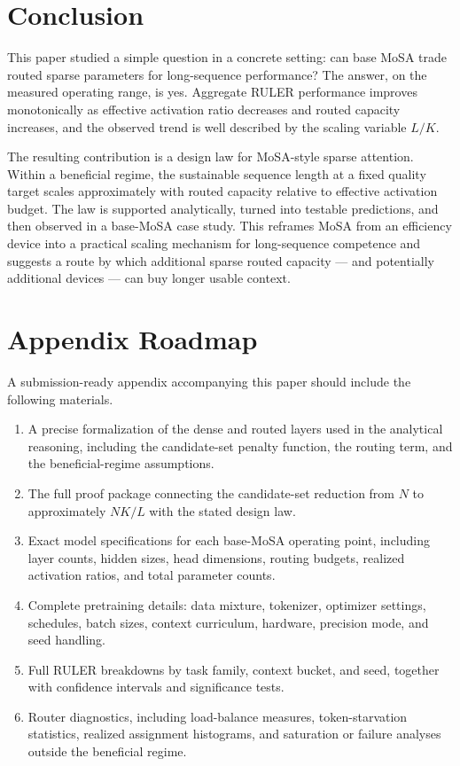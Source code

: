 \documentclass[11pt]{article}
\begin{document}
\section{Conclusion}

This paper studied a simple question in a concrete setting: can base MoSA trade routed sparse parameters for long-sequence performance? The answer, on the measured operating range, is yes. Aggregate RULER performance improves monotonically as effective activation ratio decreases and routed capacity increases, and the observed trend is well described by the scaling variable $L/K$.

The resulting contribution is a design law for MoSA-style sparse attention. Within a beneficial regime, the sustainable sequence length at a fixed quality target scales approximately with routed capacity relative to effective activation budget. The law is supported analytically, turned into testable predictions, and then observed in a base-MoSA case study. This reframes MoSA from an efficiency device into a practical scaling mechanism for long-sequence competence and suggests a route by which additional sparse routed capacity --- and potentially additional devices --- can buy longer usable context.

\appendix

\section{Appendix Roadmap}

A submission-ready appendix accompanying this paper should include the following materials.

\begin{enumerate}[leftmargin=2em]
    \item A precise formalization of the dense and routed layers used in the analytical reasoning, including the candidate-set penalty function, the routing term, and the beneficial-regime assumptions.
    \item The full proof package connecting the candidate-set reduction from $N$ to approximately $NK/L$ with the stated design law.
    \item Exact model specifications for each base-MoSA operating point, including layer counts, hidden sizes, head dimensions, routing budgets, realized activation ratios, and total parameter counts.
    \item Complete pretraining details: data mixture, tokenizer, optimizer settings, schedules, batch sizes, context curriculum, hardware, precision mode, and seed handling.
    \item Full RULER breakdowns by task family, context bucket, and seed, together with confidence intervals and significance tests.
    \item Router diagnostics, including load-balance measures, token-starvation statistics, realized assignment histograms, and saturation or failure analyses outside the beneficial regime.
\end{enumerate}
\end{document}
